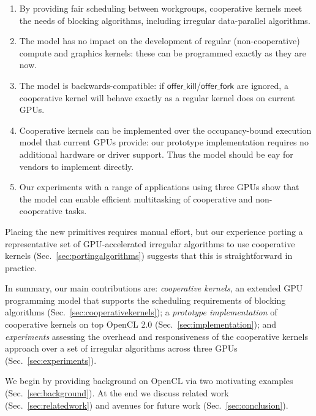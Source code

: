 \documentclass[numbers,nocopyrightspace,10pt]{sigplanconf}
\newcommand{\mysec}{Sec.~}
\newcommand{\offerfork}{\mathsf{offer\_fork}}
\newcommand{\offerkill}{\mathsf{offer\_kill}}
\begin{document}
\vspace{-1mm}
\begin{enumerate}

\item By providing fair scheduling between workgroups, cooperative
  kernels meet the needs of blocking algorithms, including irregular
  data-parallel algorithms.

\item The model has no impact on the development of regular
  (non-cooperative) compute and graphics kernels: these can be programmed exactly as they
  are now.

\item The model is backwards-compatible: if $\offerkill$/$\offerfork$ are ignored, a cooperative kernel will behave
  exactly as a regular kernel does on current GPUs.

\item Cooperative kernels can be implemented over the occupancy-bound
  execution model that current GPUs provide: our prototype implementation requires
  no additional hardware or driver support.  Thus the model should be eay for vendors to implement directly.

\item Our experiments with a range of applications using three GPUs show that the model can enable efficient multitasking of cooperative and non-cooperative
  tasks.

\end{enumerate}
\vspace{-1mm}

Placing the new primitives requires manual effort, but our experience porting a representative set of
GPU-accelerated irregular algorithms to use cooperative kernels
(\mysec\ref{sec:portingalgorithms}) suggests that this is straightforward in practice.

In summary, our main contributions are:
\emph{cooperative kernels}, an extended GPU programming model that supports the scheduling requirements of blocking algorithms (\mysec\ref{sec:cooperativekernels}); a \emph{prototype implementation} of cooperative
  kernels on top OpenCL 2.0
  (\mysec\ref{sec:implementation}); and \emph{experiments} assessing the overhead and responsiveness of the cooperative kernels approach over a set of irregular algorithms across three GPUs (\mysec\ref{sec:experiments}).

We begin by providing background on OpenCL via two motivating examples (\mysec\ref{sec:background}).  At the end we discuss related work (\mysec\ref{sec:relatedwork}) and avenues for future work (\mysec\ref{sec:conclusion}).
\end{document}
